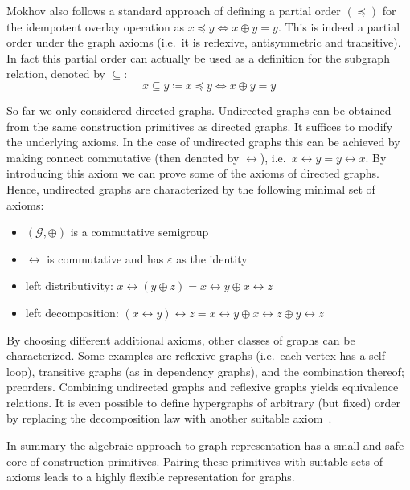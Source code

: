 \documentclass{article}
\renewcommand{\epsilon}{\varepsilon}
\newcommand{\eps}{\epsilon}
\newcommand{\overlay}{\oplus}
\begin{document}
Mokhov also follows a standard approach of defining a partial order $(\preceq)$ for the
idempotent overlay operation as $x \preceq y \iff x \overlay y = y$. This is indeed
a partial order under the graph axioms (i.e.\ it is reflexive, antisymmetric and
transitive). In fact this partial order can actually be used as a definition for
the subgraph relation, denoted by $\subseteq$:
\[
  x \subseteq y \coloneqq x \preceq y \iff x \overlay y = y
\]

So far we only considered directed graphs. Undirected graphs can be
obtained from the same construction primitives as directed graphs. It suffices
to modify the underlying axioms. In the case of undirected graphs this can be
achieved by making connect commutative (then denoted by $\leftrightarrow$),
i.e.\ $x \leftrightarrow y = y \leftrightarrow x$. By introducing this axiom we
can prove some of the axioms of directed graphs. Hence, undirected graphs are
characterized by the following minimal set of axioms:
\begin{itemize}
\item $(\mathcal{G}, \oplus)$ is a commutative semigroup
\item $\leftrightarrow$ is commutative and has $\eps$ as the identity
\item left distributivity: $x \leftrightarrow (y \oplus z) = x \leftrightarrow
  y \oplus x \leftrightarrow z$
\item left decomposition: $(x \leftrightarrow y) \leftrightarrow z = x
  \leftrightarrow y \oplus x \leftrightarrow z \oplus y \leftrightarrow z$
\end{itemize}
By choosing different additional axioms, other classes of graphs can be
characterized. Some examples are reflexive graphs (i.e.\ each vertex has a
self-loop), transitive graphs (as in dependency graphs), and the combination
thereof; preorders. Combining undirected graphs and reflexive graphs yields
equivalence relations. It is even possible to define hypergraphs of arbitrary
(but fixed) order by replacing the decomposition law with another suitable
axiom~\cite{mokhov2017algebraic}.

In summary the algebraic approach to graph representation has a small and safe
core of construction primitives. Pairing these primitives with suitable sets of
axioms leads to a highly flexible representation for graphs.
\end{document}
